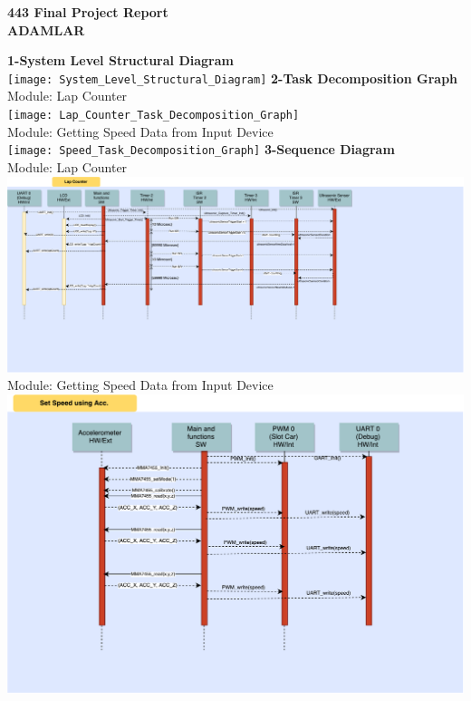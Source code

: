 \documentclass{article}
\begin{document}
\begin{center}
{\huge\textbf {443 Final Project Report}}\\[1in]
{\huge\textbf {ADAMLAR}}\\
\end{center}
\clearpage

{\huge\textbf {1-System Level Structural Diagram}}
\\
\texttt{[image: System\_Level\_Structural\_Diagram]}
\pagebreak
{\huge\textbf {2-Task Decomposition Graph}}
\\
{\huge {Module: Lap Counter}}
\\
\texttt{[image: Lap\_Counter\_Task\_Decomposition\_Graph]}
\\[0.2in]
{\huge {Module: Getting Speed Data from Input Device}}
\\[0.2in]
\texttt{[image: Speed\_Task\_Decomposition\_Graph]}
\clearpage
{\huge\textbf {3-Sequence Diagram}}
\\
{\huge {Module: Lap Counter}}
\\
\includegraphics[scale=0.3]{Lap_Counter_Seq_Diagram}
\\
{\huge {Module: Getting Speed Data from Input Device}}
\\
\includegraphics[scale=0.5]{Read_Acc_Control_Speed}
\end{document}
